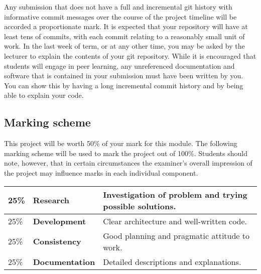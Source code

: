 \documentclass[12pt, a4paper]{article}
\begin{document}
Any submission that does not have a full and incremental git history with informative commit messages over the course of the project timeline will be accorded a proportionate mark.
It is expected that your repository will have at least tens of commits, with each commit relating to a reasonably small unit of work.
In the last week of term, or at any other time, you may be asked by the lecturer to explain the contents of your git repository.
While it is encouraged that students will engage in peer learning, any unreferenced documentation and software that is contained in your submission must have been written by you.
You can show this by having a long incremental commit history and by being able to explain your code.

\subsection*{Marking scheme}
This project will be worth 50\% of your mark for this module.
The following marking scheme will be used to mark the project out of 100\%.
Students should note, however, that in certain circumstances the examiner's overall impression of the project may influence marks in each individual component.

\begin{center}
\begin{tabular}{llp{8.4cm}}
\toprule
25\% & \textbf{Research} & Investigation of problem and trying possible solutions. \\
\midrule
25\% & \textbf{Development} & Clear architecture and well-written code. \\
\midrule
25\% & \textbf{Consistency} & Good planning and pragmatic attitude to work. \\
\midrule
25\% & \textbf{Documentation} & Detailed descriptions and explanations. \\
\bottomrule
\end{tabular}
\end{center}
\end{document}
